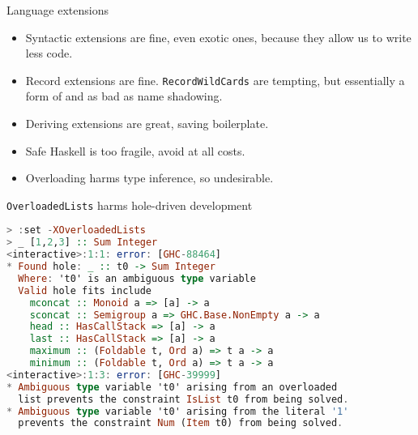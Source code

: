 \documentclass[handout]{beamer}
\begin{document}
\begin{frame}{Language extensions}

\begin{itemize}[<+->]\itemsep3ex
  \item Syntactic extensions are fine, even exotic ones,
        because they allow us to write less code.
  \item Record extensions are fine. {\tt RecordWildCards} are tempting,
        but essentially a form of and as bad as name shadowing.
  \item Deriving extensions are great, saving boilerplate.
  \item Safe Haskell is too fragile, avoid at all costs.
  \item Overloading harms type inference, so undesirable.
\end{itemize}

\end{frame}

\begin{frame}[fragile]{{\tt OverloadedLists} harms hole-driven development}

\begin{lstlisting}[language=Haskell]
> :set -XOverloadedLists
> _ [1,2,3] :: Sum Integer
<interactive>:1:1: error: [GHC-88464]
* Found hole: _ :: t0 -> Sum Integer
  Where: 't0' is an ambiguous type variable
  Valid hole fits include
    mconcat :: Monoid a => [a] -> a
    sconcat :: Semigroup a => GHC.Base.NonEmpty a -> a
    head :: HasCallStack => [a] -> a
    last :: HasCallStack => [a] -> a
    maximum :: (Foldable t, Ord a) => t a -> a
    minimum :: (Foldable t, Ord a) => t a -> a
<interactive>:1:3: error: [GHC-39999]
* Ambiguous type variable 't0' arising from an overloaded
  list prevents the constraint IsList t0 from being solved.
* Ambiguous type variable 't0' arising from the literal '1'
  prevents the constraint Num (Item t0) from being solved.
\end{lstlisting}

\end{frame}
\end{document}
